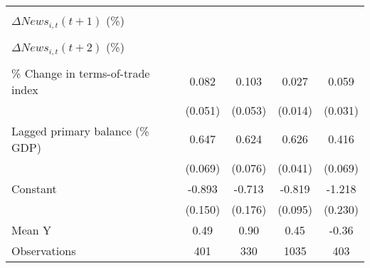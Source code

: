 {\begin{tabular}{l*{4}{c}}
                    &                     &                     &                     &                     \\
\addlinespace
$ \Delta News_{i,t}(t+1)$ (\%)&                     &                     &                     &                     \\
                    &                     &                     &                     &                     \\
\addlinespace
$ \Delta News_{i,t}(t+2)$ (\%)&                     &                     &                     &                     \\
                    &                     &                     &                     &                     \\
\addlinespace
\% Change in terms-of-trade index&       0.082         &       0.103\sym{*}  &       0.027\sym{*}  &       0.059\sym{*}  \\
                    &     (0.051)         &     (0.053)         &     (0.014)         &     (0.031)         \\
\addlinespace
Lagged primary balance (\% GDP)&       0.647\sym{***}&       0.624\sym{***}&       0.626\sym{***}&       0.416\sym{***}\\
                    &     (0.069)         &     (0.076)         &     (0.041)         &     (0.069)         \\
\addlinespace
Constant            &      -0.893\sym{***}&      -0.713\sym{***}&      -0.819\sym{***}&      -1.218\sym{***}\\
                    &     (0.150)         &     (0.176)         &     (0.095)         &     (0.230)         \\
\midrule
Mean Y              &        0.49         &        0.90         &        0.45         &       -0.36         \\
Observations        &         401         &         330         &        1035         &         403         \\
\bottomrule
\end{tabular}
}

